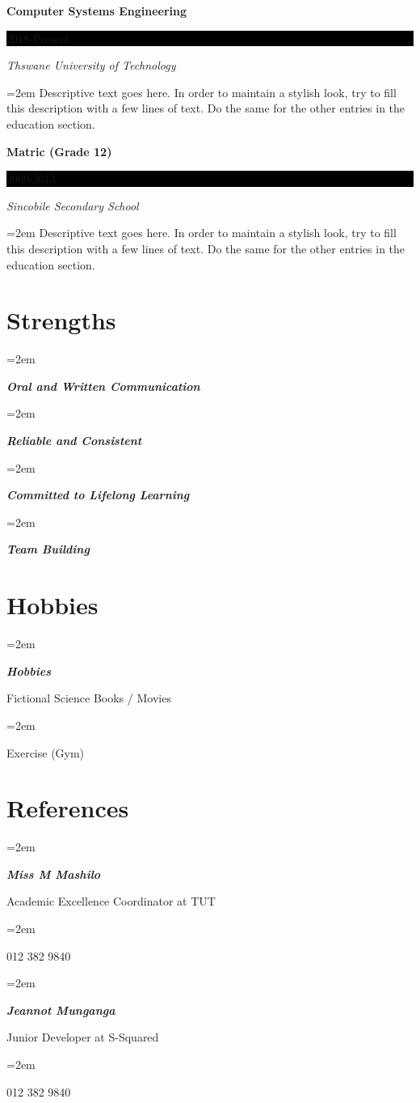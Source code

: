 \documentclass[paper=a4,fontsize=12pt]{scrartcl} %
\newlength{\spacebox}
\newcommand{\sepspace}{\vspace*{1em}}		%
\newcommand{\NewPart}[1]{\section*{#1}}
\newcommand{\PersonalEntry}[2]{
		\noindent\hangindent=2em\hangafter=0 %
		\parbox{\spacebox}{        %
    \textit{\textbf{#1}}}			   %
		\hspace{1em} #2 \par}    %
\newcommand{\SkillsEntry}[2]{      %
		\noindent\hangindent=2em\hangafter=0 %
		\parbox{\spacebox}{        %
    \textit{\textbf{#1}}}			   %
		\hspace{1em} #2 \par}    %
\newcommand{\StrengthEntry}[2]{      %
		\noindent\hangindent=2em\hangafter=0 %
    \parbox{18em}{        %
    \textit{\textbf{#1}}}			   %
		\hspace{1em} #2 \par}    %
\newcommand{\EducationEntry}[4]{
		\noindent \textbf{#1} \hfill      %
		\colorbox{Black}{%
			\parbox{6em}{%
			\hfill\color{White}#2}} \par  %
		\noindent \textit{#3} \par        %
		\noindent\hangindent=2em\hangafter=0 \small #4 %
		\normalsize \par}
\begin{document}
\EducationEntry{Computer Systems Engineering}{2018-Present}{Thswane University
  of Technology}{Descriptive text goes here. In order to maintain a stylish look, try to fill this description with a few lines of text. Do the same for the other entries in the education section.}
\sepspace

\EducationEntry{Matric (Grade 12)}{2009-2013}{Sincobile Secondary School}{Descriptive text goes here. In order to maintain a stylish look, try to fill this description with a few lines of text. Do the same for the other entries in the education section.}



\NewPart{Strengths}{}

\StrengthEntry{Oral and Written Communication}{}
\StrengthEntry{Reliable and Consistent}{}
\StrengthEntry{Committed to Lifelong Learning}{}
\StrengthEntry{Team Building}{}



\NewPart{Hobbies}{}

\SkillsEntry{Hobbies}{Fictional Science Books / Movies }
\SkillsEntry{}{Exercise (Gym)}


\NewPart{References}{}

\SkillsEntry{Miss M Mashilo}{Academic Excellence Coordinator at TUT}
\SkillsEntry{}{012 382 9840\\}
\SkillsEntry{Jeannot Munganga}{Junior Developer at S-Squared}
\SkillsEntry{}{012 382 9840}
\end{document}
